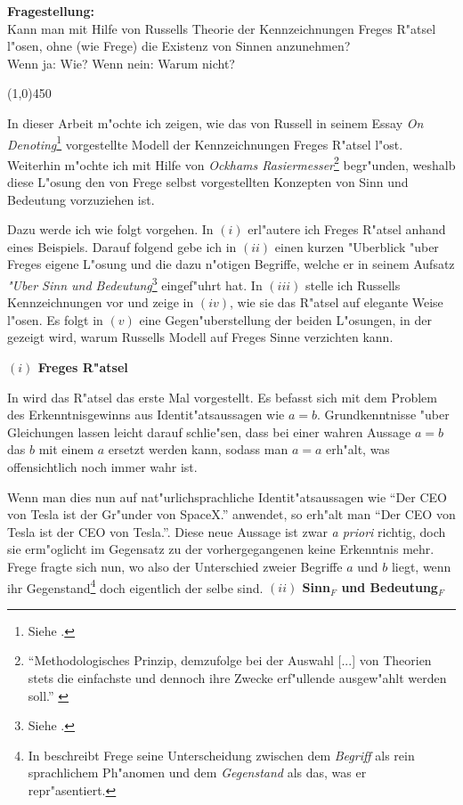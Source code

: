 \documentclass[a4paper, emulatestandardclasses, 12pt]{scrartcl}
\begin{document}
\begin{onehalfspace} 

\noindent\textbf{Fragestellung:}\\
\indent Kann man mit Hilfe von Russells Theorie der Kennzeichnungen Freges R"atsel l"osen, ohne (wie Frege) die Existenz von Sinnen anzunehmen?\\\indent Wenn ja: Wie? Wenn nein: Warum nicht?

\begin{center}
\vspace{-9pt}\line(1,0){450}
\end{center}


In dieser Arbeit m"ochte ich zeigen, wie das von Russell in seinem Essay \emph{On Denoting}\footnote{Siehe \citep*{russell1905denoting}.} vorgestellte Modell der Kennzeichnungen Freges R"atsel l"ost. Weiterhin m"ochte ich mit Hilfe von \emph{Ockhams Rasiermesser}\footnote{"`Methodologisches Prinzip, demzufolge bei der Auswahl [...] von Theorien stets die einfachste und dennoch ihre Zwecke erf"ullende ausgew"ahlt werden soll."' \citep{ockham}} begr"unden, weshalb diese L"osung den von Frege selbst vorgestellten Konzepten von Sinn und Bedeutung vorzuziehen ist.

Dazu werde ich wie folgt vorgehen. In $(i)$ erl"autere ich Freges R"atsel anhand eines Beispiels. Darauf folgend gebe ich in $(ii)$ einen kurzen "Uberblick "uber Freges eigene L"osung und die dazu n"otigen Begriffe, welche er in seinem Aufsatz \emph{"Uber Sinn und Bedeutung}\footnote{Siehe \citep{sinnundbedeutung}.} eingef"uhrt hat. In $(iii)$ stelle ich Russells Kennzeichnungen vor und zeige in $(iv)$, wie sie das R"atsel auf elegante Weise l"osen. Es folgt in $(v)$ eine Gegen"uberstellung der beiden L"osungen, in der gezeigt wird, warum Russells Modell auf Freges Sinne verzichten kann. %
\vspace{5mm}

\noindent\textbf{$(i)$ Freges R"atsel}

In \citep{sinnundbedeutung} wird das R"atsel das erste Mal vorgestellt. Es befasst sich mit dem Problem des Erkenntnisgewinns aus Identit"atsaussagen wie $a = b$. Grundkenntnisse "uber Gleichungen lassen leicht darauf schlie"sen, dass bei einer wahren Aussage $a = b$ das $b$ mit einem $a$ ersetzt werden kann, sodass man $a = a$ erh"alt, was offensichtlich noch immer wahr ist.

Wenn man dies nun auf nat"urlichsprachliche Identit"atsaussagen wie "`Der CEO von Tesla ist der Gr"under von SpaceX."' anwendet, so erh"alt man "`Der CEO von Tesla ist der CEO von Tesla."'. Diese neue Aussage ist zwar \emph{a priori} richtig, doch sie erm"oglicht im Gegensatz zu der vorhergegangenen keine Erkenntnis mehr. Frege fragte sich nun, wo also der Unterschied zweier Begriffe $a$ und $b$ liegt, wenn ihr Gegenstand\footnote{In \citep{begriffundgegenstand} beschreibt Frege seine Unterscheidung zwischen dem \emph{Begriff} als rein sprachlichem Ph"anomen und dem \emph{Gegenstand} als das, was er repr"asentiert.} doch eigentlich der selbe sind.\vspace{3mm}
\newpage
\noindent\textbf{$(ii)$ Sinn$_{F}$ und Bedeutung$_{F}$}	


\end{onehalfspace}
\end{document}
